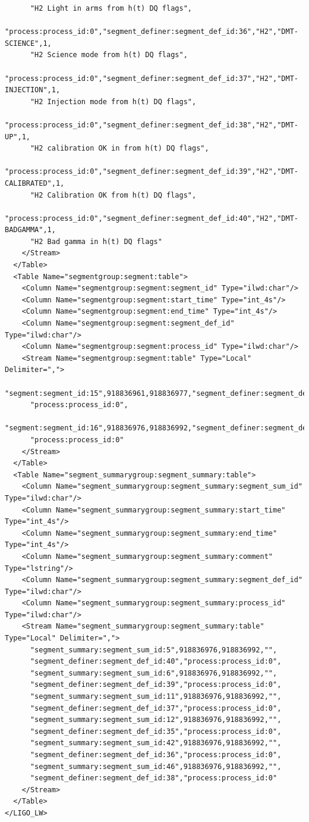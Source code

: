 {\begin{verbatim}
      "H2 Light in arms from h(t) DQ flags",
      "process:process_id:0","segment_definer:segment_def_id:36","H2","DMT-SCIENCE",1,
      "H2 Science mode from h(t) DQ flags",
      "process:process_id:0","segment_definer:segment_def_id:37","H2","DMT-INJECTION",1,
      "H2 Injection mode from h(t) DQ flags",
      "process:process_id:0","segment_definer:segment_def_id:38","H2","DMT-UP",1,
      "H2 calibration OK in from h(t) DQ flags",
      "process:process_id:0","segment_definer:segment_def_id:39","H2","DMT-CALIBRATED",1,
      "H2 Calibration OK from h(t) DQ flags",
      "process:process_id:0","segment_definer:segment_def_id:40","H2","DMT-BADGAMMA",1,
      "H2 Bad gamma in h(t) DQ flags"
    </Stream>
  </Table>
  <Table Name="segmentgroup:segment:table">
    <Column Name="segmentgroup:segment:segment_id" Type="ilwd:char"/>
    <Column Name="segmentgroup:segment:start_time" Type="int_4s"/>
    <Column Name="segmentgroup:segment:end_time" Type="int_4s"/>
    <Column Name="segmentgroup:segment:segment_def_id" Type="ilwd:char"/>
    <Column Name="segmentgroup:segment:process_id" Type="ilwd:char"/>
    <Stream Name="segmentgroup:segment:table" Type="Local" Delimiter=",">
      "segment:segment_id:15",918836961,918836977,"segment_definer:segment_def_id:35",
      "process:process_id:0",
      "segment:segment_id:16",918836976,918836992,"segment_definer:segment_def_id:37",
      "process:process_id:0"
    </Stream>
  </Table>
  <Table Name="segment_summarygroup:segment_summary:table">
    <Column Name="segment_summarygroup:segment_summary:segment_sum_id" Type="ilwd:char"/>
    <Column Name="segment_summarygroup:segment_summary:start_time" Type="int_4s"/>
    <Column Name="segment_summarygroup:segment_summary:end_time" Type="int_4s"/>
    <Column Name="segment_summarygroup:segment_summary:comment" Type="lstring"/>
    <Column Name="segment_summarygroup:segment_summary:segment_def_id" Type="ilwd:char"/>
    <Column Name="segment_summarygroup:segment_summary:process_id" Type="ilwd:char"/>
    <Stream Name="segment_summarygroup:segment_summary:table" Type="Local" Delimiter=",">
      "segment_summary:segment_sum_id:5",918836976,918836992,"",
      "segment_definer:segment_def_id:40","process:process_id:0",
      "segment_summary:segment_sum_id:6",918836976,918836992,"",
      "segment_definer:segment_def_id:39","process:process_id:0",
      "segment_summary:segment_sum_id:11",918836976,918836992,"",
      "segment_definer:segment_def_id:37","process:process_id:0",
      "segment_summary:segment_sum_id:12",918836976,918836992,"",
      "segment_definer:segment_def_id:35","process:process_id:0",
      "segment_summary:segment_sum_id:42",918836976,918836992,"",
      "segment_definer:segment_def_id:36","process:process_id:0",
      "segment_summary:segment_sum_id:46",918836976,918836992,"",
      "segment_definer:segment_def_id:38","process:process_id:0"
    </Stream>
  </Table>
</LIGO_LW>
\end{verbatim}
}

